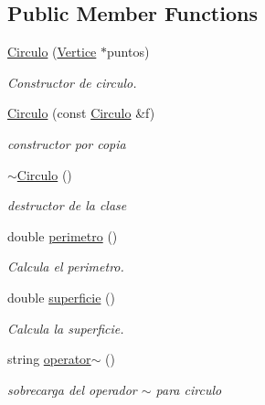 \subsection*{Public Member Functions}
\begin{DoxyCompactItemize}
\item 
\hyperlink{class_circulo_a790ee75260b927c3b54d534a5d2bab1c}{Circulo} (\hyperlink{class_vertice}{Vertice} $\ast$puntos)
\begin{DoxyCompactList}\small\item\em Constructor de circulo. \end{DoxyCompactList}\item 
\hyperlink{class_circulo_a6ed2ee2a18458c368ab402db2189f60f}{Circulo} (const \hyperlink{class_circulo}{Circulo} \&f)
\begin{DoxyCompactList}\small\item\em constructor por copia \end{DoxyCompactList}\item 
\mbox{\label{class_circulo_a8efe39e0e89487519cd802f0738d3bf4}} 
\hyperlink{class_circulo_a8efe39e0e89487519cd802f0738d3bf4}{$\sim$\+Circulo} ()
\begin{DoxyCompactList}\small\item\em destructor de la clase \end{DoxyCompactList}\item 
\mbox{\label{class_circulo_acc35f8fdd7303fca9fe54b0da458bdf2}} 
double \hyperlink{class_circulo_acc35f8fdd7303fca9fe54b0da458bdf2}{perimetro} ()
\begin{DoxyCompactList}\small\item\em Calcula el perimetro. \end{DoxyCompactList}\item 
\mbox{\label{class_circulo_a12314ab6d649a9e6c1300c6950a46ce7}} 
double \hyperlink{class_circulo_a12314ab6d649a9e6c1300c6950a46ce7}{superficie} ()
\begin{DoxyCompactList}\small\item\em Calcula la superficie. \end{DoxyCompactList}\item 
\mbox{\label{class_circulo_ac79dde5c3b5205403a91c694054a3d66}} 
string \hyperlink{class_circulo_ac79dde5c3b5205403a91c694054a3d66}{operator$\sim$} ()
\begin{DoxyCompactList}\small\item\em sobrecarga del operador $\sim$ para circulo \end{DoxyCompactList}\end{DoxyCompactItemize}
